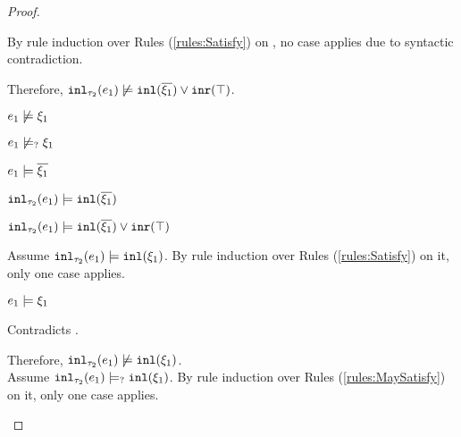 \begin{proof}
\begin{byCases}
\begin{byCases}
\begin{byCases}
\begin{byCases}
\begin{pfsteps*}
                \end{pfsteps*}
                By rule induction over Rules (\ref{rules:Satisfy}) on , no case applies due to syntactic contradiction.
            \end{byCases}
            Therefore, $\mathtt{inl}_{\tau_2}({e_1}) \not\models \mathtt{inl}(\overline{\xi_1}) \vee \mathtt{inr}(\top)$.
        \item[\csatisfy{e_1}{\cdual{\xi_1}}]
            \begin{pfsteps*}
            \item $e_1 \not\models \xi_1$  
            \item $e_1 \not\models_{?} \xi_1$  
            \item $e_1 \models \overline{\xi_1}$  
            \item $\mathtt{inl}_{\tau_2}({e_1}) \models \mathtt{inl}(\overline{\xi_1})$  
            \item $\mathtt{inl}_{\tau_2}({e_1}) \models \mathtt{inl}(\overline{\xi_1}) \vee \mathtt{inr}(\top)$ 
            \end{pfsteps*}
            Assume $\mathtt{inl}_{\tau_2}({e_1}) \models \mathtt{inl}(\xi_1)$. By rule induction over Rules (\ref{rules:Satisfy}) on it, only one case applies.
            \begin{byCases}
            \item[\text{(\ref{rule:CSInl})}]
                \begin{pfsteps*}
                \item $e_1 \models \xi_1$
                \end{pfsteps*}
                Contradicts .
            \end{byCases}
            Therefore, $\mathtt{inl}_{\tau_2}({e_1}) \not\models \mathtt{inl}(\xi_1)$. \\
            Assume $\mathtt{inl}_{\tau_2}({e_1}) \models_{?} \mathtt{inl}(\xi_1)$. By rule induction over Rules (\ref{rules:MaySatisfy}) on it, only one case applies.
            \begin{byCases}
            \item[\text{(\ref{rule:CMSNotVal})}]
                \begin{pfsteps*}

\end{pfsteps*}
\end{byCases}
\end{byCases}
\end{byCases}
\end{byCases}
\end{proof}
